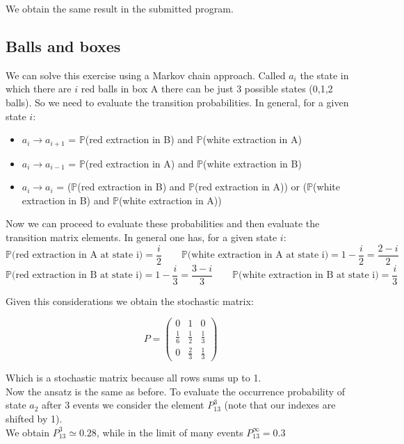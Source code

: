 We obtain the same result in the submitted program.

\subsection*{Balls and boxes}

We can solve this exercise using a Markov chain approach.
Called $a_i$ the state in which there are $i$ red balls in box A there can be just 3 possible states (0,1,2 balls).
So we need to evaluate the transition probabilities. In general, for a given state $i$:

\begin{itemize}
\item  $a_i \to a_{i+1}$ = $\mathbb{P}$(red extraction in B) and $\mathbb{P}$(white extraction in A)
\item  $a_i \to a_{i-1}$ = $\mathbb{P}$(red extraction in A) and $\mathbb{P}$(white extraction in B)
\item  $a_i \to a_{i}$ = ($\mathbb{P}$(red extraction in B) and $\mathbb{P}$(red extraction in A)) or ($\mathbb{P}$(white extraction in B) and $\mathbb{P}$(white extraction in A))
\end{itemize}

Now we can proceed to evaluate these probabilities and then evaluate the transition matrix elements.
In general one has, for a given state $i$:
$$ \mathbb{P}\text{(red extraction in A at state i)} = \frac{i}{2} \qquad \mathbb{P}\text{(white extraction in A at state i)} = 1- \frac{i}{2} = \frac{2-i}{2} $$
$$ \mathbb{P}\text{(red extraction in B at state i)} = 1 - \frac{i}{3} =  \frac{3-i}{3} \qquad \mathbb{P}\text{(white extraction in B at state i)} = \frac{i}{3} $$

Given this considerations we obtain the stochastic matrix:

$$ P =
\begin{pmatrix} 
0 & 1 & 0 \\
\frac{1}{6} & \frac{1}{2} & \frac{1}{3} \\
0 & \frac{2}{3} & \frac{1}{3}
\end{pmatrix}
$$

Which is a stochastic matrix because all rows sums up to 1. \\
Now the ansatz is the same as before. To evaluate the occurrence probability of state $a_2$ after 3 events we consider the element $P^3_{13}$ (note that our indexes are shifted by 1). \\
We obtain $P^3_{13} \simeq 0.28$, while in the limit of many events $P^{\infty}_{13} = 0.3$